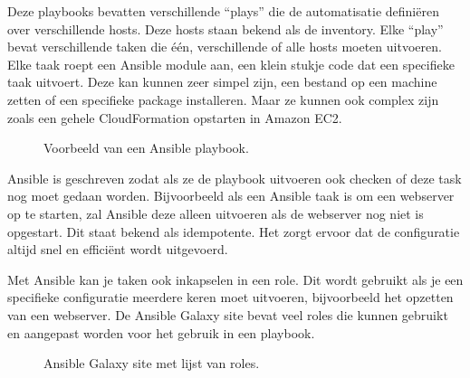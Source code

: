 Deze playbooks bevatten verschillende ``plays'' die de automatisatie definiëren over verschillende hosts. Deze hosts staan bekend als de inventory. Elke ``play'' bevat verschillende taken die één, verschillende of alle hosts moeten uitvoeren. Elke taak roept een Ansible module aan, een klein stukje code dat een specifieke taak uitvoert. Deze kan kunnen zeer simpel zijn, een bestand op een machine zetten of een specifieke package installeren. Maar ze kunnen ook complex zijn zoals een gehele CloudFormation opstarten in Amazon EC2.
\begin{figure}[!htb]
    \caption{Voorbeeld van een Ansible playbook.}
    \label{fig:playbook}
\end{figure}

Ansible is geschreven zodat als ze de playbook uitvoeren ook checken of deze task nog moet gedaan worden. Bijvoorbeeld als een Ansible taak is om een webserver op te starten, zal Ansible deze alleen uitvoeren als de webserver nog niet is opgestart. Dit staat bekend als idempotente. Het zorgt ervoor dat de configuratie altijd snel en efficiënt wordt uitgevoerd.

Met Ansible kan je taken ook inkapselen in een role. Dit wordt gebruikt als je een specifieke configuratie meerdere keren moet uitvoeren, bijvoorbeeld het opzetten van een webserver. De Ansible Galaxy site bevat veel roles die kunnen gebruikt en aangepast worden voor het gebruik in een playbook.
\begin{figure}[!htb]
    \caption{Ansible Galaxy site met lijst van roles.}
    \label{fig:agalaxy}
\end{figure}



